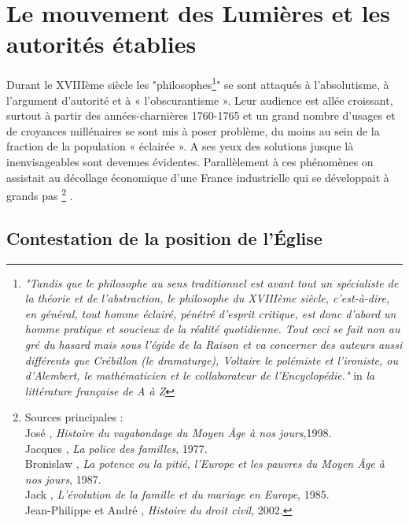 

\chapter[Le mouvement des Lumières]{Le mouvement des Lumières et les autorités établies}


 Durant le XVIIIème siècle les "philosophes\footnote{\emph{"Tandis que le philosophe au sens traditionnel est avant tout un spécialiste de la théorie et de l'abstraction, le philosophe du XVIIIème siècle, c'est-à-dire, en général, tout homme éclairé, pénétré d'esprit critique, est donc d'abord un homme pratique et soucieux de la réalité quotidienne. Tout ceci se fait non au gré du hasard mais sous l'égide de la Raison et va concerner des auteurs aussi différents que Crébillon (le dramaturge), Voltaire le polémiste et l'ironiste, ou d'Alembert, le mathématicien et le collaborateur de l'Encyclopédie."} in \emph{la littérature française de A à Z}}" se sont attaqués à l'absolutisme, à l'argument d'autorité et à « l'obscurantisme ». Leur audience est allée croissant, surtout à partir des années-charnières 1760-1765 et un grand nombre d'usages et de croyances millénaires se sont mis à poser problème, du moins au sein de la fraction de la population « éclairée ». A ses yeux des solutions jusque là inenvisageables sont devenues évidentes. Parallèlement à ces phénomènes on assistait au décollage économique d'une France industrielle qui se développait à grands pas%
\footnote{Sources principales :
\\José , \emph{Histoire du vagabondage du Moyen Âge à nos jours},1998.
\\Jacques {}, \emph{La police des familles}, 1977.
\\Bronislaw {}, \emph{La potence ou la pitié, l'Europe et les pauvres du Moyen Âge à nos jours}, 1987.
\\Jack {}, \emph{L'évolution de la famille et du mariage en Europe}, 1985.
\\Jean-Philippe  et André , \emph{Histoire du droit civil}, 2002.}%
.

 
\section{Contestation de la position de l'Église}

